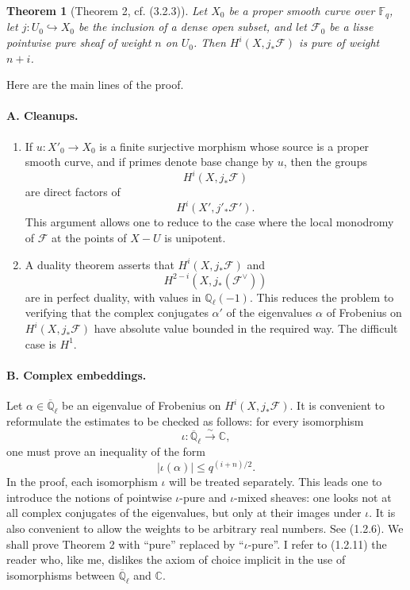 \documentclass[11pt]{article}
\newtheorem{theorem}{Theorem}
\theoremstyle{remark}
\newcommand{\Ql}{\mathbb{Q}_\ell}
\newcommand{\CC}{\mathbb{C}}
\newcommand{\Fq}{\mathbb{F}_q}
\newcommand{\Abar}{\overline{\mathbb{Q}}_\ell}
\begin{document}
\begin{theorem}[Theorem 2, cf. (3.2.3)]
Let $X_0$ be a proper smooth curve over $\Fq$, let $j:U_0\hookrightarrow X_0$ be the inclusion of a dense open subset, and let $\mathcal F_0$ be a lisse pointwise pure sheaf of weight $n$ on $U_0$. Then $H^i(X,j_{*}\mathcal F)$ is pure of weight $n+i$.
\end{theorem}

Here are the main lines of the proof.

\paragraph{A. Cleanups.}
\begin{enumerate}[label=(\roman*)]
\item If $u:X'_0\to X_0$ is a finite surjective morphism whose source is a proper smooth curve, and if primes denote base change by $u$, then the groups
\[
H^i(X,j_{*}\mathcal F)
\]
are direct factors of
\[
H^i(X',j'_*\mathcal F').
\]
This argument allows one to reduce to the case where the local monodromy of $\mathcal F$ at the points of $X-U$ is unipotent.
\item A duality theorem asserts that $H^i(X,j_{*}\mathcal F)$ and
\[
H^{2-i}(X,j_{*}(\mathcal F^\vee))
\]
are in perfect duality, with values in $\Ql(-1)$. This reduces the problem to verifying that the complex conjugates $\alpha'$ of the eigenvalues $\alpha$ of Frobenius on $H^i(X,j_{*}\mathcal F)$ have absolute value bounded in the required way. The difficult case is $H^1$.
\end{enumerate}

\paragraph{B. Complex embeddings.}
Let $\alpha\in \Abar$ be an eigenvalue of Frobenius on $H^i(X,j_{*}\mathcal F)$. It is convenient to reformulate the estimates to be checked as follows: for every isomorphism
\[
\iota:\Abar\xrightarrow{\sim}\CC,
\]
one must prove an inequality of the form
\[
|\iota(\alpha)|\le q^{(i+n)/2}.
\]
In the proof, each isomorphism $\iota$ will be treated separately. This leads one to introduce the notions of pointwise $\iota$-pure and $\iota$-mixed sheaves: one looks not at all complex conjugates of the eigenvalues, but only at their images under $\iota$. It is also convenient to allow the weights to be arbitrary real numbers. See (1.2.6). We shall prove Theorem 2 with ``pure'' replaced by ``$\iota$-pure''. I refer to (1.2.11) the reader who, like me, dislikes the axiom of choice implicit in the use of isomorphisms between $\Abar$ and $\CC$.
\end{document}
